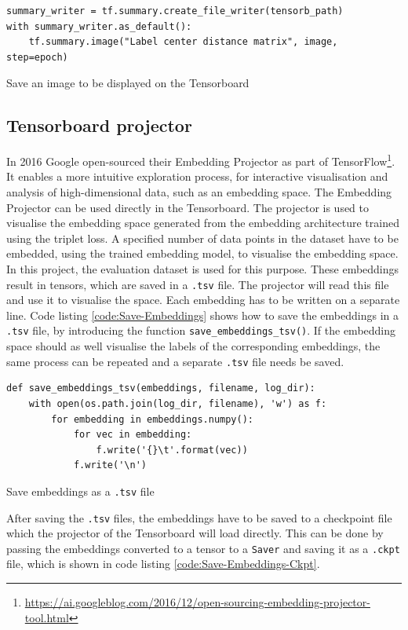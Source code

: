 \begin{code}[H]
\begin{verbatim}
summary_writer = tf.summary.create_file_writer(tensorb_path)
with summary_writer.as_default():
    tf.summary.image("Label center distance matrix", image, step=epoch)
\end{verbatim}
\caption{Save an image to be displayed on the Tensorboard}
\label{code:Summary-Image}
\end{code}

\subsection{Tensorboard projector}
\label{sub:Tensorboard-Projector}
In 2016 Google open-sourced their Embedding Projector as part of TensorFlow\footnote{\url{https://ai.googleblog.com/2016/12/open-sourcing-embedding-projector-tool.html}}. It enables a more intuitive exploration process, for interactive visualisation and analysis of high-dimensional data, such as an embedding space. The Embedding Projector can be used directly in the Tensorboard. The projector is used to visualise the embedding space generated from the embedding architecture trained using the triplet loss.
\newline
\newline
A specified number of data points in the dataset have to be embedded, using the trained embedding model, to visualise the embedding space. In this project, the evaluation dataset is used for this purpose. These embeddings result in tensors, which are saved in a \texttt{.tsv} file. The projector will read this file and use it to visualise the space. Each embedding has to be written on a separate line. Code listing \ref{code:Save-Embeddings} shows how to save the embeddings in a \texttt{.tsv} file, by introducing the function \texttt{save\_embeddings\_tsv()}. If the embedding space should as well visualise the labels of the corresponding embeddings, the same process can be repeated and a separate \texttt{.tsv} file needs be saved.

\begin{code}[H]
\begin{verbatim}
def save_embeddings_tsv(embeddings, filename, log_dir):
    with open(os.path.join(log_dir, filename), 'w') as f:
        for embedding in embeddings.numpy():
            for vec in embedding:
                f.write('{}\t'.format(vec))
            f.write('\n')
\end{verbatim}
\caption{Save embeddings as a \texttt{.tsv} file}
\label{code:Save-Embeddings}
\end{code}
\noindent
After saving the \texttt{.tsv} files, the embeddings have to be saved to a checkpoint file which the projector of the Tensorboard will load directly. This can be done by passing the embeddings converted to a tensor to a \texttt{Saver} and saving it as a \texttt{.ckpt} file, which is shown in code listing \ref{code:Save-Embeddings-Ckpt}.

